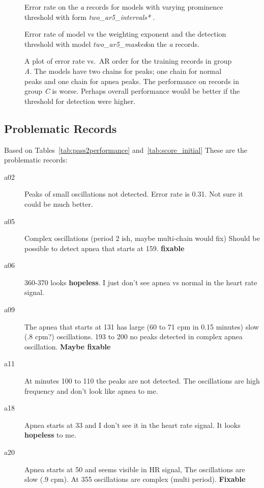 \documentclass[12pt]{article}
\newcommand{\BestModel}{\emph{two\_ar5\_masked}}
\begin{document}
\begin{figure}
  \centering
    \caption{Error rate on the \emph{a} records for models with
      varying prominence threshold with form
      \emph{two\_ar5\_intervals*} .}
  \label{fig:prominence_study}
\end{figure}

\begin{figure}
  \centering
    \caption{Error rate of model vs the weighting exponent and the
      detection threshold with model \BestModel on the
      \emph{a} records.}
  \label{fig:power_threshold}
\end{figure}

\begin{figure}
  \centering
    \caption{A plot of error rate vs.\ AR order for the training
      records in group \emph{A}.  The models have two chains for
      peaks; one chain for normal peaks and one chain for apnea
      peaks.  The performance on records in group \emph{C} is worse.
      Perhaps overall performance would be better if the threshold for
      detection were higher.}
  \label{fig:errors_vs_ar_order}
\end{figure}

\subsection{Problematic Records}
\label{sec:problematic_records}

Based on Tables~\ref{tab:pass2performance} and~\ref{tab:score_initial}
These are the problematic records:
\begin{description}
\item[a02] Peaks of small oscillations not detected.  Error rate is
  0.31.  Not sure it could be much better.
\item[a05] Complex oscillations (period 2 ish, maybe multi-chain would
  fix) Should be possible to detect apnea that starts at 159.
  \textbf{fixable}
\item[a06] 360-370 looks \textbf{hopeless}.  I just don't see apnea vs
  normal in the heart rate signal.
\item[a09] The apnea that starts at 131 has large (60 to 71 cpm in
  0.15 minutes) slow (.8 cpm?) oscillations.  193 to 200 no peaks
  detected in complex apnea oscillation.  \textbf{Maybe fixable}
\item[a11] At minutes 100 to 110 the peaks are not detected.  The
  oscillations are high frequency and don't look like apnea to me.
\item[a18] Apnea starts at 33 and I don't see it in the heart rate
  signal.  It looks \textbf{hopeless} to me.
\item[a20] Apnea starts at 50 and seems visible in HR signal,  The
  oscillations are slow (.9 cpm).  At 355 oscillations are complex
  (multi period).  \textbf{Fixable}
\end{description}
\end{document}
